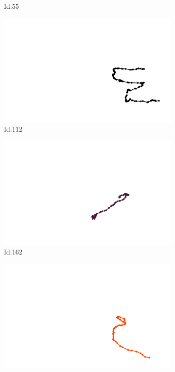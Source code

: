 \documentclass[12pt,twoside]{report}
\begin{document}
\begin{figure}
\begin{subfigure}[b]{0.20\textwidth}
\caption{Id:55}
\end{subfigure}
\begin{subfigure}[b]{0.20\textwidth}
\centering
\includegraphics[width=\textwidth]{../trajectories/112.png}
\caption{Id:112}
\end{subfigure}
\begin{subfigure}[b]{0.20\textwidth}
\centering
\includegraphics[width=\textwidth]{../trajectories/162.png}
\caption{Id:162}
\end{subfigure}
\begin{subfigure}[b]{0.20\textwidth}
\centering
\includegraphics[width=\textwidth]{../trajectories/202.png}

\end{subfigure}
\end{figure}
\end{document}
